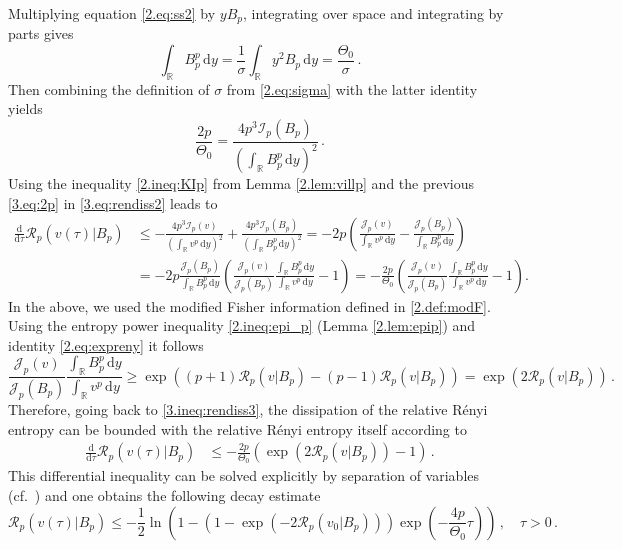\documentclass[12pt]{amsart}
\newcommand{\R}{{\mathbb R}}
\newcommand{\renyi}{{\mathcal{R}}}
\newcommand{\dd}{{\mathrm{d}}}
\newcommand{\M}{\Theta}
\newcommand{\J}{\mathcal{J}}
\newcommand{\I}{\mathcal{I}}
\theoremstyle{plain}
\theoremstyle{definition}
\theoremstyle{remark}
\begin{document}
Multiplying equation \eqref{2.eq:ss2} by $yB_p$, integrating over space and integrating by parts gives
\begin{equation*}
    \int_{\R}B_p^p\,\dd y = \frac{1}{\sigma}\int_{\R}y^2B_p\,\dd y = \frac{\M_0}{\sigma}\,.
\end{equation*}
Then combining the definition of $\sigma$ from \eqref{2.eq:sigma} with the latter identity yields
\begin{equation}\label{3.eq:2p}
    \frac{2p}{\M_0} = \frac{4p^3 \I_p(B_p)}{\left(\int_{\R}B_p^p\, \dd y\right)^2}\,.
\end{equation}
Using the inequality \eqref{2.ineq:KIp} from Lemma \ref{2.lem:villp} and the previous \eqref{3.eq:2p} in \eqref{3.eq:rendiss2} leads to
\begin{align}\nonumber
    \frac{\dd}{\dd \tau}\renyi_p(v(\tau)|B_p) &\leq -\frac{4p^3\I_p(v)}{\left(\int_{\R}v^p\, \dd y\right)^2} + \frac{4p^3\I_p(B_p)}{\left(\int_{\R}B_p^p\, \dd y\right)^2} = -2p\left(\frac{\J_p(v)}{\int_{\R}v^p\, \dd y} - \frac{\J_p(B_p)}{\int_{\R}B_p^p\, \dd y}\right)\\
    &= -2p\frac{\J_p(B_p)}{\int_{\R}B_p^p\, \dd y}\left(\frac{\J_p(v)}{\J_p(B_p)}\frac{\int_{\R}B_p^p\, \dd y}{\int_{\R}v^p\, \dd y} - 1\right) = -\frac{2p}{\M_0}\left(\frac{\J_p(v)}{\J_p(B_p)}\frac{\int_{\R}B_p^p\, \dd y}{\int_{\R}v^p\, \dd y} - 1\right).\label{3.ineq:rendiss3}
\end{align}
In the above, we used the modified Fisher information defined in \eqref{2.def:modF}. Using the entropy power inequality \eqref{2.ineq:epi_p} (Lemma \ref{2.lem:epip}) and identity \eqref{2.eq:expreny} it follows 
\begin{equation*}
    \frac{\J_p(v)}{\J_p(B_p)}\frac{\int_{\R}B_p^p\, \dd y}{\int_{\R}v^p\, \dd y}\geq \exp\left((p+1)\renyi_p(v|B_p) - (p-1)\renyi_p(v|B_p)\right) = \exp(2\renyi_p(v|B_p))\,.
\end{equation*} 
Therefore, going back to \eqref{3.ineq:rendiss3}, the dissipation of the relative R\'enyi entropy can be bounded with the relative R\'enyi entropy itself according to
\begin{align}\label{3.ineq:rendiss4}
    \frac{\dd}{\dd \tau}\renyi_{p}(v(\tau)|B_p) &\leq -\frac{2p}{\M_0}\left(\exp(2\renyi_p(v|B_p)) - 1\right)\,.
\end{align}
This differential inequality can be solved explicitly by separation of variables (cf.~\cite[Section 3]{CaTo14}) and one obtains the following decay estimate
\begin{equation*}
    \renyi_{p}(v(\tau)|B_p) \leq -\frac{1}{2}\ln\left(1 - \left(1 - \exp({-2\renyi_p(v_0|B_p)})\right)\exp\left(-\frac{4p}{\M_0}\tau\right)\right)\,,\quad \tau > 0\,.
\end{equation*}
\end{document}
